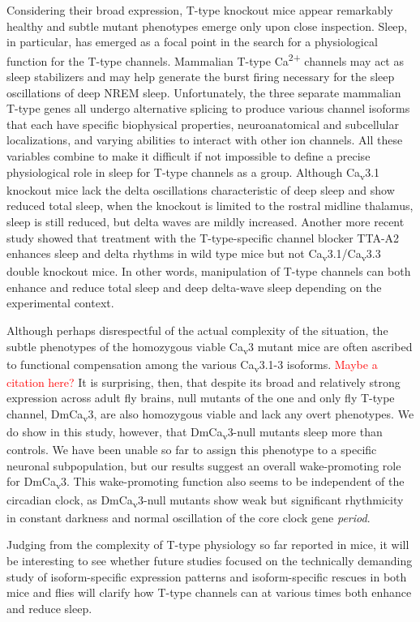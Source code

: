 Considering their broad expression, T-type knockout mice appear remarkably healthy and subtle mutant phenotypes emerge only upon close inspection.
Sleep, in particular, has emerged as a focal point in the search for a physiological function for the T-type channels.
Mammalian T-type Ca\textsuperscript{2+} channels may act as sleep stabilizers and may help generate the burst firing necessary for the sleep oscillations of deep NREM sleep.
Unfortunately, the three separate mammalian T-type genes all undergo alternative splicing to produce various channel isoforms that each have specific biophysical properties, neuroanatomical and subcellular localizations, and varying abilities to interact with other ion channels.
All these variables combine to make it difficult if not impossible to define a precise physiological role in sleep for T-type channels as a group.
Although Ca\textsubscript{v}3.1 knockout mice lack the delta oscillations characteristic of deep sleep and show reduced total sleep\cite{Lee:2004ey}, when the knockout is limited to the rostral midline thalamus, sleep is still reduced, but delta waves are mildly increased\cite{anderson:2005aa}.
Another more recent study showed that treatment with the T-type-specific channel blocker TTA-A2 enhances sleep and delta rhythms in wild type mice but not Ca\textsubscript{v}3.1/Ca\textsubscript{v}3.3 double knockout mice\cite{kraus:2010aa}.
In other words, manipulation of T-type channels can both enhance and reduce total sleep and deep delta-wave sleep depending on the experimental context.

Although perhaps disrespectful of the actual complexity of the situation, the subtle phenotypes of the homozygous viable Ca\textsubscript{v}3 mutant mice are often ascribed to functional compensation among the various Ca\textsubscript{v}3.1-3 isoforms. \textcolor{red}{Maybe a citation here?}
It is surprising, then, that despite its broad and relatively strong expression across adult fly brains, null mutants of the one and only fly T-type channel, DmCa\textsubscript{v}3, are also homozygous viable and lack any overt phenotypes.
We do show in this study, however, that DmCa\textsubscript{v}3-null mutants sleep more than controls.
We have been unable so far to assign this phenotype to a specific neuronal subpopulation, but our results suggest an overall wake-promoting role for DmCa\textsubscript{v}3.
This wake-promoting function also seems to be independent of the circadian clock, as DmCa\textsubscript{v}3-null mutants show weak but significant rhythmicity in constant darkness and normal oscillation of the core clock gene \emph{period}.

Judging from the complexity of T-type physiology so far reported in mice, it will be interesting to see whether future studies focused on the technically demanding study of isoform-specific expression patterns and isoform-specific rescues in both mice and flies will clarify how T-type channels can at various times both enhance and reduce sleep.

  